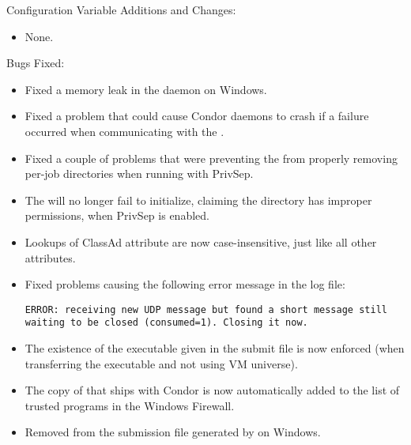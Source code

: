 \noindent Configuration Variable Additions and Changes:

\begin{itemize}

\item None.

\end{itemize}

\noindent Bugs Fixed:

\begin{itemize}

\item Fixed a memory leak in the  daemon on Windows.

\item Fixed a problem that could cause Condor daemons to crash if a
  failure occurred when communicating with the .

\item Fixed a couple of problems that were preventing the
   from properly removing per-job directories
  when running with PrivSep.

\item The  will no longer fail to initialize, 
  claiming the  directory has improper permissions,
  when PrivSep is enabled.

\item Lookups of ClassAd attribute  are now
  case-insensitive, just like all other attributes.

\item Fixed problems causing the following error message in the log file:

\footnotesize
\begin{verbatim}
ERROR: receiving new UDP message but found a short message still waiting to be closed (consumed=1). Closing it now.
\end{verbatim}
\normalsize

\item The existence of the executable given in the submit file is now 
  enforced (when transferring the executable and not using VM 
  universe).

\item The copy of  that ships with Condor is now automatically 
  added to the list of trusted programs in the Windows Firewall.

\item Removed  from the submission file
  generated by  on Windows.


\end{itemize}
